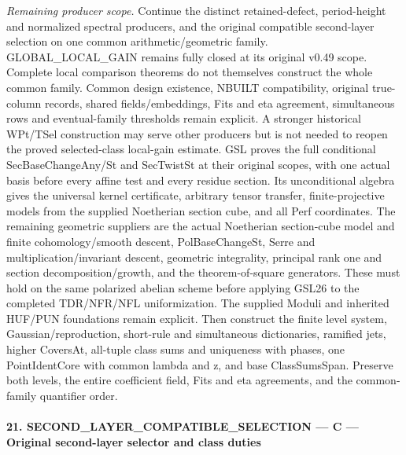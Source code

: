 \emph{Remaining producer scope.} Continue the distinct retained-defect, period-height and normalized spectral producers, and the original compatible second-layer selection on one common arithmetic/geometric family. GLOBAL\_\allowbreak LOCAL\_\allowbreak GAIN remains fully closed at its original v0.49 scope. Complete local comparison theorems do not themselves construct the whole common family. Common design existence, NBUILT compatibility, original true-column records, shared fields/embeddings, Fits and eta agreement, simultaneous rows and eventual-family thresholds remain explicit. A stronger historical WPt/TSel construction may serve other producers but is not needed to reopen the proved selected-class local-gain estimate. GSL proves the full conditional SecBaseChangeAny/St and SecTwistSt at their original scopes, with one actual basis before every affine test and every residue section. Its unconditional algebra gives the universal kernel certificate, arbitrary tensor transfer, finite-projective models from the supplied Noetherian section cube, and all Perf coordinates. The remaining geometric suppliers are the actual Noetherian section-cube model and finite cohomology/smooth descent, PolBaseChangeSt, Serre and multiplication/invariant descent, geometric integrality, principal rank one and section decomposition/growth, and the theorem-of-square generators. These must hold on the same polarized abelian scheme before applying GSL26 to the completed TDR/NFR/NFL uniformization. The supplied Moduli and inherited HUF/PUN foundations remain explicit. Then construct the finite level system, Gaussian/reproduction, short-rule and simultaneous dictionaries, ramified jets, higher CoversAt, all-tuple class sums and uniqueness with phases, one PointIdentCore with common lambda and z, and base ClassSumsSpan. Preserve both levels, the entire coefficient field, Fits and eta agreements, and the common-family quantifier order.



\paragraph{21. SECOND\_\allowbreak LAYER\_\allowbreak COMPATIBLE\_\allowbreak SELECTION — C — Original second-layer selector and class duties}


